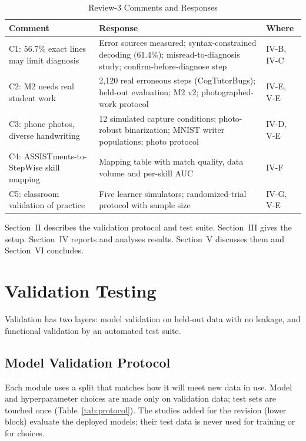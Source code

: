 \documentclass[conference]{IEEEtran}
\begin{document}
\begin{table}[!t]
\caption{Review-3 Comments and Responses}
\label{tab:response}
\centering
\footnotesize
\setlength{\tabcolsep}{3pt}
\begin{tabular}{L{2.2cm}L{4.25cm}L{1.3cm}}
\toprule
Comment & Response & Where\\
\midrule
C1: 56.7\% exact lines may limit diagnosis & Error sources measured; syntax-constrained decoding (61.4\%); misread-to-diagnosis study; confirm-before-diagnose step & IV-B, IV-C\\
C2: M2 needs real student work & 2,120 real erroneous steps (CogTutorBugs); held-out evaluation; M2 v2; photographed-work protocol & IV-E, V-E\\
C3: phone photos, diverse handwriting & 12 simulated capture conditions; photo-robust binarization; MNIST writer populations; photo protocol & IV-D, V-E\\
C4: ASSISTments-to-StepWise skill mapping & Mapping table with match quality, data volume and per-skill AUC & IV-F\\
C5: classroom validation of practice & Five learner simulators; randomized-trial protocol with sample size & IV-G, V-E\\
\bottomrule
\end{tabular}
\end{table}

Section~II describes the validation protocol and test suite. Section~III gives the setup. Section~IV reports and analyses results. Section~V discusses them and Section~VI concludes.

\section{Validation Testing}
Validation has two layers: model validation on held-out data with no leakage, and functional validation by an automated test suite.

\subsection{Model Validation Protocol}
Each module uses a split that matches how it will meet new data in use. Model and hyperparameter choices are made only on validation data; test sets are touched once (Table~\ref{tab:protocol}). The studies added for the revision (lower block) evaluate the deployed models; their test data is never used for training or for choices.
\end{document}
